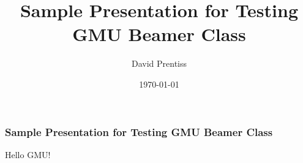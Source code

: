 \documentclass{beamer}
\title{Sample Presentation for Testing GMU Beamer Class}
\author{David Prentiss}
\institute{George Mason University}
\date{\today}
\begin{document}
\frame{\titlepage}

\begin{frame}
    \frametitle{Sample Presentation for Testing GMU Beamer Class}
    Hello GMU!
\end{frame}
\end{document}
